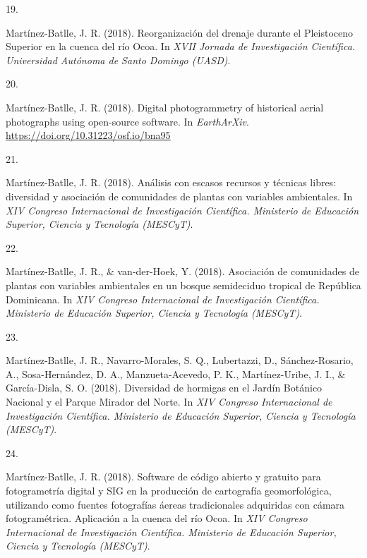 \documentclass[10pt,a4paper,]{article}
\newlength{\cslhangindent}
\newlength{\csllabelwidth}
\newcommand{\CSLLeftMargin}[1]{\parbox[t]{\csllabelwidth}{\hfill #1~}}
\newcommand{\CSLRightInline}[1]{\parbox[t]{\linewidth - \cslhangindent - \csllabelwidth}{#1}\vspace{0.8ex}}
\begin{document}
\leavevmode\hypertarget{ref-Jose_Ramon_Martinez-Batlle_108008287}{}%
\CSLLeftMargin{19. }
\CSLRightInline{Martínez-Batlle, J. R. (2018). Reorganización del
drenaje durante el Pleistoceno Superior en la cuenca del río Ocoa. In
\emph{XVII Jornada de Investigación Científica. Universidad Autónoma de
Santo Domingo (UASD)}.}

\leavevmode\hypertarget{ref-Jose_Ramon_Martinez-Batlle_76604201}{}%
\CSLLeftMargin{20. }
\CSLRightInline{Martínez-Batlle, J. R. (2018). Digital photogrammetry of
historical aerial photographs using open-source software. In
\emph{EarthArXiv}. \url{https://doi.org/10.31223/osf.io/bna95}}

\leavevmode\hypertarget{ref-Jose_Ramon_Martinez-Batlle_108164639}{}%
\CSLLeftMargin{21. }
\CSLRightInline{Martínez-Batlle, J. R. (2018). Análisis con escasos
recursos y técnicas libres: diversidad y asociación de comunidades de
plantas con variables ambientales. In \emph{XIV Congreso Internacional
de Investigación Científica. Ministerio de Educación Superior, Ciencia y
Tecnología (MESCyT)}.}

\leavevmode\hypertarget{ref-Jose_Ramon_Martinez-Batlle_108164664}{}%
\CSLLeftMargin{22. }
\CSLRightInline{Martínez-Batlle, J. R., \& van-der-Hoek, Y. (2018).
Asociación de comunidades de plantas con variables ambientales en un
bosque semideciduo tropical de República Dominicana. In \emph{XIV
Congreso Internacional de Investigación Científica. Ministerio de
Educación Superior, Ciencia y Tecnología (MESCyT)}.}

\leavevmode\hypertarget{ref-Jose_Ramon_Martinez-Batlle_108164842}{}%
\CSLLeftMargin{23. }
\CSLRightInline{Martínez-Batlle, J. R., Navarro-Morales, S. Q.,
Lubertazzi, D., Sánchez-Rosario, A., Sosa-Hernández, D. A.,
Manzueta-Acevedo, P. K., Martínez-Uribe, J. I., \& García-Disla, S. O.
(2018). Diversidad de hormigas en el Jardín Botánico Nacional y el
Parque Mirador del Norte. In \emph{XIV Congreso Internacional de
Investigación Científica. Ministerio de Educación Superior, Ciencia y
Tecnología (MESCyT)}.}

\leavevmode\hypertarget{ref-Jose_Ramon_Martinez-Batlle_108164731}{}%
\CSLLeftMargin{24. }
\CSLRightInline{Martínez-Batlle, J. R. (2018). Software de código
abierto y gratuito para fotogrametría digital y SIG en la producción de
cartografía geomorfológica, utilizando como fuentes fotografías áereas
tradicionales adquiridas con cámara fotogramétrica. Aplicación a la
cuenca del río Ocoa. In \emph{XIV Congreso Internacional de
Investigación Científica. Ministerio de Educación Superior, Ciencia y
Tecnología (MESCyT)}.}
\end{document}
